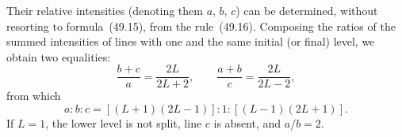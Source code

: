 Their relative intensities (denoting them $a$, $b$, $c$) can be determined, without resorting to formula~(49.15), from the rule~(49.16). Composing the ratios of the summed intensities of lines with one and the same initial (or final) level, we obtain two equalities:
\[
\frac{b + c}{a} = \frac{2L}{2L+2},\qquad \frac{a + b}{c} = \frac{2L}{2L-2},
\]
from which
\[
a : b : c = [(L+1)(2L-1)] : 1 : [(L-1)(2L+1)].
\]
If $L = 1$, the lower level is not split, line $c$ is absent, and $a/b = 2$.
